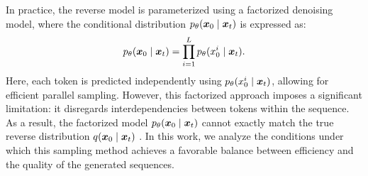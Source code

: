 In practice, the reverse model is parameterized using a factorized denoising model, where the conditional distribution $p_\theta({\bm{x}}_0 \mid {\bm{x}}_t)$ is expressed as:
\begin{equation}
\label{eq:parallel_sample}
    p_\theta({\bm{x}}_0 \mid {\bm{x}}_t) = \prod_{i=1}^L p_\theta(x_0^i \mid {\bm{x}}_t).
\end{equation}
Here, each token is predicted independently using $p_\theta(x_0^i \mid {\bm{x}}_t)$, allowing for efficient parallel sampling. However, this factorized approach imposes a significant limitation: it disregards interdependencies between tokens within the sequence. As a result, the factorized model $p_\theta({\bm{x}}_0 \mid {\bm{x}}_t)$ cannot exactly match the true reverse distribution $q({\bm{x}}_0 \mid {\bm{x}}_t)$ \citep{xu2024energy}. In this work, we analyze the conditions under which this sampling method achieves a favorable balance between efficiency and the quality of the generated sequences.